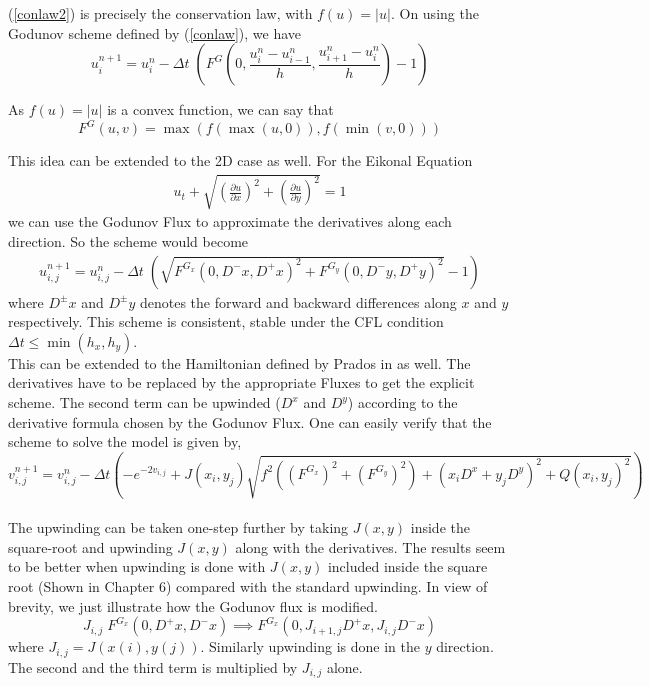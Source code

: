 \noindent
(\ref{conlaw2}) is precisely the conservation law, with $f(u) = \lvert u \rvert$. On using the Godunov scheme defined by (\ref{conlaw}), we have
\begin{equation}
	u_i^{n+1} = u_i^{n}	 - \Delta t \;\left(F^G\left(0,\frac{u_{i}^n - u_{i-1}^n}{h},\frac{u_{i+1}^n - u_{i}^n}{h}\right) -1 \right)
\end{equation}

\noindent
As $f(u) = \lvert u \rvert$ is a convex function, we can say that
\begin{equation}
	F^G(u,v) = \max(f(\max(u,0)), f(\min(v,0)))
\end{equation}

\noindent
This idea can be extended to the 2D case as well. For the Eikonal Equation
\begin{eqnarray}
	u_t + \sqrt{\left(\frac{\partial u }{\partial x}\right)^2 + \left(\frac{\partial u }{\partial y}\right)^2}  = 1
\end{eqnarray}
we can use the Godunov Flux to approximate the derivatives along each direction. So the scheme would become
\begin{eqnarray}
	u_{i,j}^{n+1} = u_{i,j}^n - \Delta t \; \left(\sqrt{F^{G_x}(0,D^-x,D^+x)^2 + F^{G_y}(0,D^-y,D^+y)^2} - 1\right)
\end{eqnarray}
where $D^\pm x$ and $D^\pm y$ denotes the forward and backward differences along $x$ and $y$ respectively. This scheme is consistent, stable under the CFL condition $\Delta t \le \min(h_x,h_y)$. \\

\noindent
This can be extended to the Hamiltonian defined by Prados in \cite{prados2} as well. The derivatives have to be replaced by the appropriate Fluxes to get the explicit scheme. The second term can be upwinded ($D^x$ and $D^y$) according to the derivative formula chosen by the Godunov Flux. One can easily verify that the scheme to solve the model is given by,
	\begin{equation}
		v_{i,j}^{n+1} = v_{i,j}^n - \Delta t \left(-e^{-2v_{i,j}} + J(x_i,y_j) \sqrt{f^2\left( \left(F^{G_x}\right)^2 + \left(F^{G_y}\right)^2\right)  + \left(x_iD^x + y_jD^y\right)^2 + Q(x_i,y_j)^2} \right) \label{eq:upw}
	\end{equation}\\

\noindent
The upwinding can be taken one-step further by taking $J(x,y)$ inside the square-root and upwinding $J(x,y)$ along with the derivatives. The results seem to be better when upwinding is done with $J(x,y)$ included inside the square root (Shown in Chapter 6) compared with the standard upwinding. In view of brevity, we just illustrate how the Godunov flux is modified.
\begin{equation}
	J_{i,j} \;F^{G_x}(0,D^+x,D^-x) \implies  F^{G_x}(0,J_{i+1,j}D^+x,J_{i,j}D^-x) \label{eq:upw1}
\end{equation}
where $J_{i,j} = J(x(i),y(j))$. Similarly upwinding is done in the $y$ direction. The second and the third term is multiplied by $J_{i,j}$ alone. 